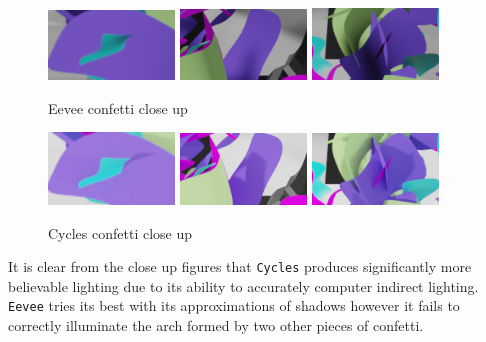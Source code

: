\documentclass[11pt]{article}
\begin{document}
\begin{figure}[htbp]
\begin{center}
\includegraphics[width=0.3\textwidth]{Images/confetti-eevee-1.png}
\includegraphics[width=0.3\textwidth]{Images/confetti-eevee-2.png}
\includegraphics[width=0.3\textwidth]{Images/confetti-eevee-3.png}
\end{center}
\caption{\label{confetti-eevee-close}Eevee confetti close up}
\end{figure}
\begin{figure}[htbp]
\begin{center}
\includegraphics[width=0.3\textwidth]{Images/confetti-cycles-1.png}
\includegraphics[width=0.3\textwidth]{Images/confetti-cycles-2.png}
\includegraphics[width=0.3\textwidth]{Images/confetti-cycles-3.png}
\end{center}
\caption{\label{confetti-cycles-close}Cycles confetti close up}
\end{figure}
\newpage
It is clear from the close up figures that \texttt{Cycles} produces significantly more
believable lighting due to its ability to accurately computer indirect lighting.
\texttt{Eevee} tries its best with its approximations of shadows however it fails to
correctly illuminate the arch formed by two other pieces of confetti.\\
\end{document}
